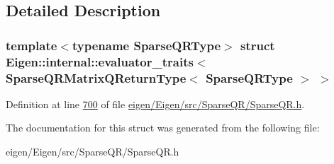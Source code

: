 \subsection{Detailed Description}
\subsubsection*{template$<$typename Sparse\+Q\+R\+Type$>$\newline
struct Eigen\+::internal\+::evaluator\+\_\+traits$<$ Sparse\+Q\+R\+Matrix\+Q\+Return\+Type$<$ Sparse\+Q\+R\+Type $>$ $>$}



Definition at line \hyperlink{eigen_2_eigen_2src_2_sparse_q_r_2_sparse_q_r_8h_source_l00700}{700} of file \hyperlink{eigen_2_eigen_2src_2_sparse_q_r_2_sparse_q_r_8h_source}{eigen/\+Eigen/src/\+Sparse\+Q\+R/\+Sparse\+Q\+R.\+h}.



The documentation for this struct was generated from the following file\+:\begin{DoxyCompactItemize}
\item 
eigen/\+Eigen/src/\+Sparse\+Q\+R/\+Sparse\+Q\+R.\+h\end{DoxyCompactItemize}
